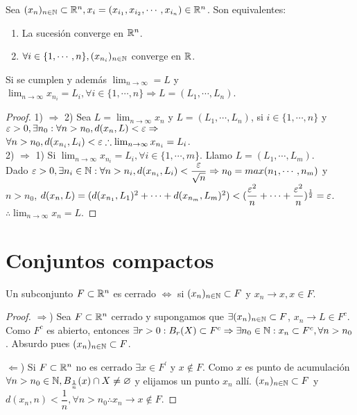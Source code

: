 \begin{prop}
  Sea $(x_n)_{n \in \mathbb{N}} \subset \mathbb{R}^n, x_i = (x_{i_1}, x_{i_2}, \cdots, x_{i_n}) \in \mathbb{R}^n$. Son equivalentes:
  \begin{enumerate}
    \item La sucesión converge en $\mathbb{R}^n$.
    \item $\forall i \in \{1, \cdots, n\}, (x_{n_i})_{n \in \mathbb{N}}$ converge en $\mathbb{R}$.
  \end{enumerate}
  Si se cumplen y además $\lim_{n \to \infty} = L$ y $\lim_{n \to \infty} x_{n_i} = L_i, \forall i \in \{1, \cdots, n\} \Rightarrow L = (L_1, \cdots, L_n)$.
  \begin{proof}
    1) $\Rightarrow$ 2) Sea $L = \lim_{n \to \infty} x_n$ y $L = (L_1, \cdots, L_n)$, si $i \in \{1, \cdots, n\}$ y $\varepsilon > 0, \exists n_0 : \forall n > n_0, d(x_n, L) < \varepsilon \Rightarrow$ \\
    $\forall n > n_0, d(x_{n_i}, L_i) < \varepsilon \therefore \lim_{n \to \infty} x_{n_i} = L_i$. \\
    2) $\Rightarrow$ 1) Si $\lim_{n \to \infty} x_{n_i} = L_i, \forall i \in \{1, \cdots, m\}$. Llamo $L = (L_1, \cdots, L_m)$. \\
    Dado $\varepsilon > 0, \exists n_i \in \mathbb{N} : \forall n > n_i, d(x_{n_i}, L_i) < \dfrac{\varepsilon}{\sqrt{n}} \Rightarrow n_0 = max(n_1, \cdots, n_m)$ y $n > n_0$, $d(x_n, L) = (d(x_{n_1}, L_1)^2 + \cdots + d(x_{n_m}, L_m)^2) < (\dfrac{\varepsilon^2}{n} + \cdots + \dfrac{\varepsilon^2}{n})^{\frac{1}{2}} = \varepsilon$. \\
    $\therefore \lim_{n \to \infty} x_n = L$.
  \end{proof}
\end{prop}

\section{Conjuntos compactos}

\begin{theorem}
  Un subconjunto $F \subset \mathbb{R}^n$ es cerrado $\iff$ si $(x_n)_{n \in \mathbb{N}} \subset F$ y $x_n \to x, x \in F$.
  \begin{proof}
    $\Rightarrow$) Sea $F \subset \mathbb{R}^n$ cerrado y supongamos que $\exists (x_n)_{n \in \mathbb{N}} \subset F$, $x_n \to L \in F^c$. Como $F^c$ es abierto, entonces $\exists r > 0 : B_r(X) \subset F^c \Rightarrow \exists n_0 \in \mathbb{N} : x_n \subset F^c, \forall n > n_0$. Absurdo pues $(x_n)_{n \in \mathbb{N}} \subset F$.

    $\Leftarrow$) Si $F \subset \mathbb{R}^n$ no es cerrado $\exists x \in F^{\prime}$ y $x \notin F$. Como $x$ es punto de acumulación $\forall n > n_0 \in \mathbb{N}, B_{\frac{1}{n}}(x) \cap X \neq \varnothing$ y elijamos un punto $x_n$ allí. $(x_n)_{n \in \mathbb{N}} \subset F$ y $d(x_n, n) < \dfrac{1}{n}, \forall n > n_0 \therefore x_n \to x \notin F$.
  \end{proof}
\end{theorem}

